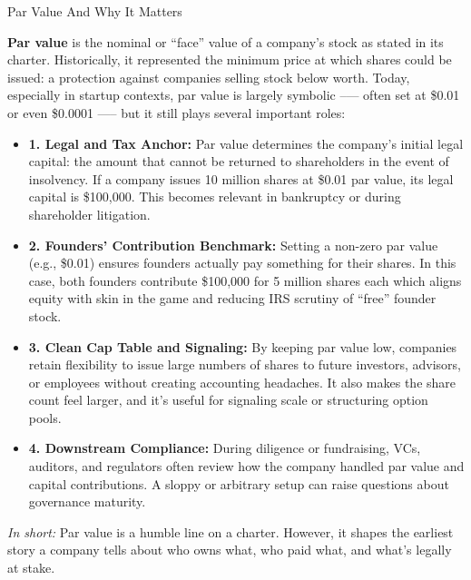 \begin{TechnicalSidebar}{Par Value And Why It Matters}

  \textbf{Par value} is the nominal or “face” value of a company’s stock as stated in its charter. Historically, it 
  represented the minimum price at which shares could be issued: a protection against companies selling stock below 
  worth. Today, especially in startup contexts, par value is largely symbolic --— often set at \$0.01 or even 
  \$0.0001 —-- but it still plays several important roles:
  
  \medskip

  \begin{itemize}
    \item \textbf{1. Legal and Tax Anchor:}  
    Par value determines the company’s initial legal capital: the amount that cannot be returned to shareholders 
    in the event of insolvency. If a company issues 10 million shares at \$0.01 par value, its legal capital is 
    \$100,000. This becomes relevant in bankruptcy or during shareholder litigation.
    
    \item \textbf{2. Founders’ Contribution Benchmark:}  
    Setting a non-zero par value (e.g., \$0.01) ensures founders actually pay something for their shares. In this 
    case, both founders contribute \$100,000 for 5 million shares each which aligns equity with skin in the game 
    and reducing IRS scrutiny of “free” founder stock.
    
    \item \textbf{3. Clean Cap Table and Signaling:}  
    By keeping par value low, companies retain flexibility to issue large numbers of shares to future investors, 
    advisors, or employees without creating accounting headaches. It also makes the share count feel larger, and  
    it's useful for signaling scale or structuring option pools.
    
    \item \textbf{4. Downstream Compliance:}  
    During diligence or fundraising, VCs, auditors, and regulators often review how the company handled par value 
    and capital contributions. A sloppy or arbitrary setup can raise questions about governance maturity.
  \end{itemize}
  
  \medskip
  
  \textit{In short:} Par value is a humble line on a charter. However, it shapes the earliest story a company tells 
  about who owns what, who paid what, and what’s legally at stake.
  
\end{TechnicalSidebar}

